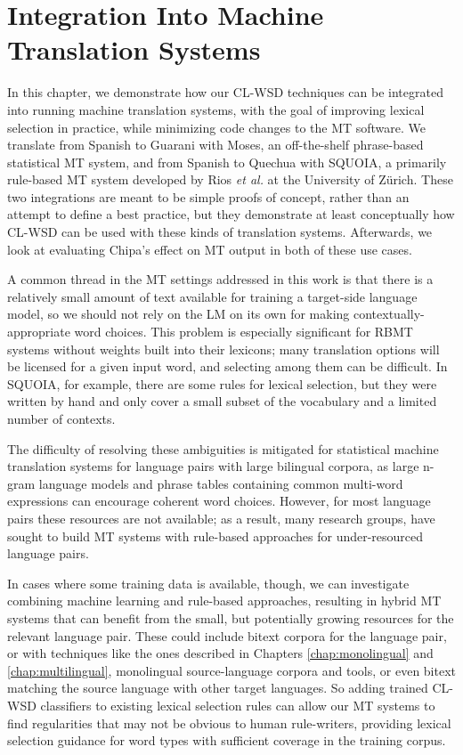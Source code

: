 \chapter{Integration Into Machine Translation Systems}
\label{chap:integration}
In this chapter, we demonstrate how our CL-WSD techniques can be integrated
into running machine translation systems, with the goal of improving lexical
selection in practice, while minimizing code changes to the MT software. We
translate from Spanish to Guarani with Moses\cite{koehn-EtAl:2007:PosterDemo},
an off-the-shelf phrase-based statistical MT system, and from Spanish to
Quechua with SQUOIA\cite{rios2015basic}, a primarily rule-based MT system
developed by Rios \emph{et al.} at the University of Zürich. These two
integrations are meant to be simple proofs of concept, rather than an attempt
to define a best practice, but they demonstrate at least conceptually how
CL-WSD can be used with these kinds of translation systems. Afterwards, we look
at evaluating Chipa's effect on MT output in both of these use cases.

A common thread in the MT settings addressed in this work is that there is a
relatively small amount of text available for training a target-side language
model, so we should not rely on the LM on its own for making
contextually-appropriate word choices. This problem is especially significant
for RBMT systems without weights built into their lexicons; many translation
options will be licensed for a given input word, and selecting among them can
be difficult. In SQUOIA, for example, there are some rules for lexical
selection, but they were written by hand and only cover a small subset of the
vocabulary and a limited number of contexts.

The difficulty of resolving these ambiguities is mitigated for statistical
machine translation systems for language pairs with large bilingual corpora, as
large n-gram language models and phrase tables containing common multi-word
expressions can encourage coherent word choices. However, for most language
pairs these resources are not available; as a result, many research groups,
have sought to build MT systems with rule-based approaches for under-resourced
language pairs.

In cases where some training data is available, though, we can investigate
combining machine learning and rule-based approaches, resulting in hybrid MT
systems that can benefit from the small, but potentially growing resources for
the relevant language pair. These could include bitext corpora for the language
pair, or with techniques like the ones described in Chapters
\ref{chap:monolingual} and \ref{chap:multilingual}, monolingual source-language
corpora and tools, or even bitext matching the source language with other
target languages. So adding trained CL-WSD classifiers to existing lexical
selection rules can allow our MT systems to find regularities that may not be
obvious to human rule-writers, providing lexical selection guidance for word
types with sufficient coverage in the training corpus.


